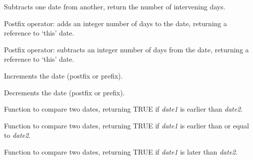 
Subtracts one date from another, return the number of intervening days.

\label{wxdateplusequals}


Postfix operator: adds an integer number of days to the date, returning
a reference to `this' date.

\label{wxdateminusequals}


Postfix operator: subtracts an integer number of days from the date, returning
a reference to `this' date.

\label{wxdateplusplus}


Increments the date (postfix or prefix).

\label{wxdateminusminus}


Decrements the date (postfix or prefix).

\label{wxdatelessthan}


Function to compare two dates, returning TRUE if {\it date1} is earlier than {\it date2}.

\label{wxdatelessthaneq}


Function to compare two dates, returning TRUE if {\it date1} is earlier than or equal to {\it date2}.

\label{wxdategreaterthan}


Function to compare two dates, returning TRUE if {\it date1} is later than {\it date2}.

\label{wxdategreaterthaneq}


